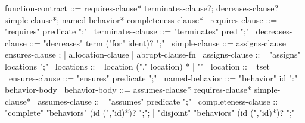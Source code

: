 \begin{syntax}
  function-contract ::= requires-clause* terminates-clause?;
                        decreases-clause? simple-clause*;
                        named-behavior* completeness-clause*
  \
  requires-clause ::= "requires" predicate ";"
  \
  terminates-clause ::= "terminates" pred ";"
  \
  decreases-clause ::= "decreases" term ("for" ident)? ";"
  \
  simple-clause ::= assigns-clause | ensures-clause ;
                | allocation-clause | abrupt-clause-fn 
  \
  assigns-clause ::= "assigns" locations ";"
  \
  locations ::= location ("," location) * | "\nothing"
  \
  location ::= tset
  \
  ensures-clause ::= "ensures" predicate ";"
  \
  named-behavior ::= "behavior" id ":" behavior-body
  \
  behavior-body ::= assumes-clause* requires-clause* simple-clause* 
  \
  assumes-clause ::= "assumes" predicate ";"
  \
  completeness-clause ::= "complete" "behaviors" (id (","id)*)? ";";
     | "disjoint" "behaviors" (id (","id)*)? ";"
\end{syntax}
